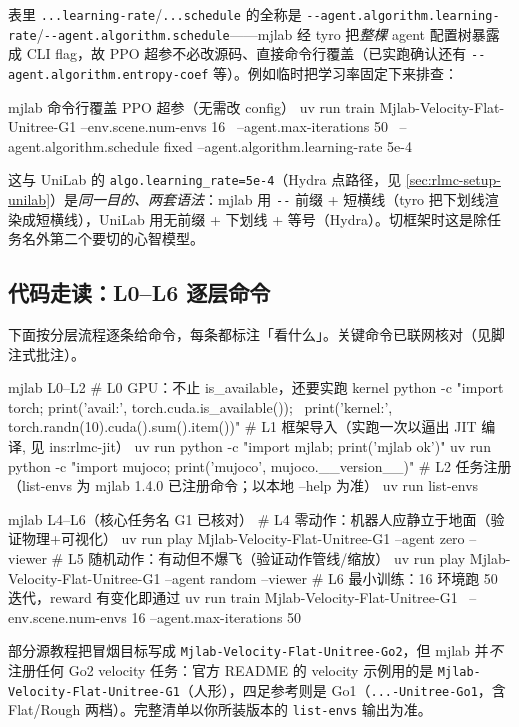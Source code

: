 \begin{note}
表里 \verb|...learning-rate|/\verb|...schedule| 的全称是 \verb|--agent.algorithm.learning-rate|/\verb|--agent.algorithm.schedule|——mjlab 经 tyro 把\emph{整棵} agent 配置树暴露成 CLI flag，故 PPO 超参不必改源码、直接命令行覆盖（已实跑确认还有 \verb|--agent.algorithm.entropy-coef| 等）。例如临时把学习率固定下来排查：
\begin{codebox}[bash]{mjlab 命令行覆盖 PPO 超参（无需改 config）}
uv run train Mjlab-Velocity-Flat-Unitree-G1 --env.scene.num-envs 16 \
    --agent.max-iterations 50 \
    --agent.algorithm.schedule fixed --agent.algorithm.learning-rate 5e-4
\end{codebox}
这与 UniLab 的 \verb|algo.learning_rate=5e-4|（Hydra 点路径，见 \cref{sec:rlmc-setup-unilab}）是\emph{同一目的、两套语法}：mjlab 用 \verb|--| 前缀 + 短横线（tyro 把下划线渲染成短横线），UniLab 用无前缀 + 下划线 + 等号（Hydra）。切框架时这是除任务名外第二个要切的心智模型。
\end{note}

\subsection{代码走读：L0--L6 逐层命令}

下面按分层流程逐条给命令，每条都标注「看什么」。关键命令已联网核对（见脚注式批注）。

\begin{codebox}[bash]{mjlab L0--L2}
# L0 GPU：不止 is_available，还要实跑 kernel
python -c "import torch; print('avail:', torch.cuda.is_available()); \
           print('kernel:', torch.randn(10).cuda().sum().item())"
# L1 框架导入（实跑一次以逼出 JIT 编译, 见 ins:rlmc-jit）
uv run python -c "import mjlab; print('mjlab ok')"
uv run python -c "import mujoco; print('mujoco', mujoco.__version__)"
# L2 任务注册（list-envs 为 mjlab 1.4.0 已注册命令；以本地 --help 为准）
uv run list-envs
\end{codebox}

\begin{codebox}[bash]{mjlab L4--L6（核心任务名 G1 已核对）}
# L4 零动作：机器人应静立于地面（验证物理+可视化）
uv run play Mjlab-Velocity-Flat-Unitree-G1 --agent zero --viewer
# L5 随机动作：有动但不爆飞（验证动作管线/缩放）
uv run play Mjlab-Velocity-Flat-Unitree-G1 --agent random --viewer
# L6 最小训练：16 环境跑 50 迭代，reward 有变化即通过
uv run train Mjlab-Velocity-Flat-Unitree-G1 \
    --env.scene.num-envs 16 --agent.max-iterations 50
\end{codebox}
部分源教程把冒烟目标写成 \texttt{Mjlab-Velocity-Flat-Unitree-Go2}，但 mjlab 并\emph{不}注册任何 Go2 velocity 任务：官方 README 的 velocity 示例用的是 \texttt{Mjlab-Velocity-Flat-Unitree-G1}（人形），四足参考则是 Go1（\texttt{...-Unitree-Go1}，含 Flat/Rough 两档）。完整清单以你所装版本的 \texttt{list-envs} 输出为准。

